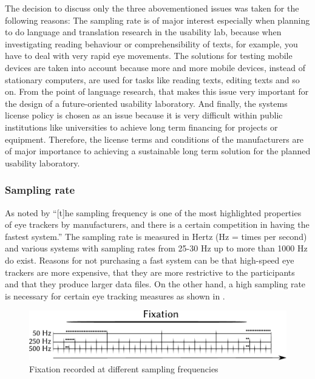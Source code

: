\documentclass[output=paper]{langsci/langscibook}
\begin{document}
The decision to discuss only the three abovementioned issues was taken for the following reasons: The sampling rate is of major interest especially when planning to do language and translation research in the usability lab, because when investigating reading behaviour or comprehensibility of texts, for example, you have to deal with very rapid eye movements. The solutions for testing mobile devices are taken into account because more and more mobile devices, instead of stationary computers, are used for tasks like reading texts, editing texts and so on. From the point of language research, that makes this issue very important for the design of a future-oriented usability laboratory. And finally, the systems license policy is chosen as an issue because it is very difficult within public institutions like universities to achieve long term financing for projects or equipment. Therefore, the license terms and conditions of the manufacturers are of major importance to achieving a sustainable long term solution for the planned usability laboratory.


\subsubsection{Sampling rate}

As noted by \citet[29]{Holmqvist2011} ``[t]he sampling frequency is one of the most highlighted properties of eye trackers by manufacturers, and there is a certain competition in having the fastest system.'' The sampling rate is measured in Hertz (Hz = times per second) and various systems with sampling rates from 25-30 Hz up to more than 1000 Hz do exist. Reasons for not purchasing a fast system can be that high-speed eye trackers are more expensive, that they are more restrictive to the participants and that they produce larger data files. On the other hand, a high sampling rate is necessary for certain eye tracking measures as shown in .

\begin{figure}
 \includegraphics[width=\textwidth]{figures/Roesener4.pdf}
 \caption{Fixation recorded at different sampling frequencies \citep[31]{Holmqvist2011}}
 \label{roesener:fig:4}
\end{figure} 
\end{document}
